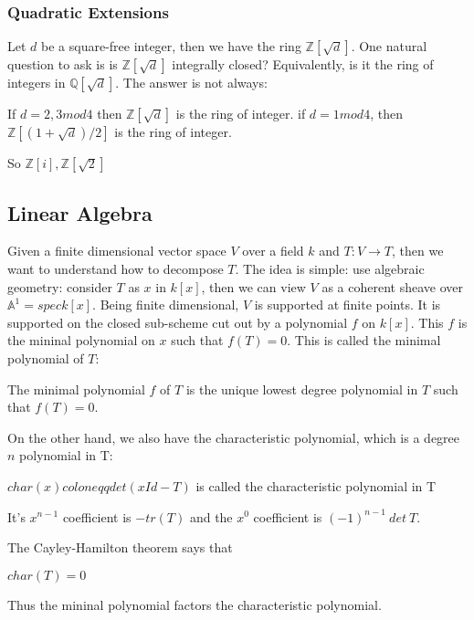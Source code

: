 \documentclass[main.tex]{subfiles}
\begin{document}
\subsubsection{Quadratic Extensions}
Let $d$ be a square-free integer, then we have the ring $\mathbb{Z}[\sqrt{d}]$. One natural question to ask is is $\mathbb{Z}[\sqrt{d}]$ integrally closed? Equivalently, is it the ring of integers in $\mathbb{Q}[\sqrt{d}]$. The answer is not always:

\begin{theorem}
If $d = 2,3 mod 4$ then $\mathbb{Z}[\sqrt{d}]$ is the ring of integer. if $d = 1 mod 4$, then $\mathbb{Z}[(1 + \sqrt{d})/2]$ is the ring of integer.
\end{theorem}

\begin{example}
So $\mathbb{Z}[i], \mathbb{Z}[\sqrt{2}]$
\end{example}


\subsection{Linear Algebra}


Given a finite dimensional vector space $V$ over a field $k$ and $T: V \rightarrow T$, then we want to understand how to decompose $T$. The idea is simple: use algebraic geometry: consider $T$ as $x$ in $k[x]$, then we can view $V$ as a coherent sheave over $\mathbb{A}^1 = spec k[x]$. Being finite dimensional, $V$ is supported at finite points. It is supported on the closed sub-scheme cut out by a polynomial $f$ on $k[x]$. This $f$ is the mininal polynomial on $x$ such that $f(T) = 0$. This is called the minimal polynomial of $T$: 

\begin{definition}
The minimal polynomial $f$ of $T$ is the unique lowest degree polynomial in $T$ such that $f(T) = 0$.
\end{definition}

On the other hand, we also have the characteristic polynomial, which is a degree $n$ polynomial in T:
\begin{definition}
$char(x) coloneqq det (xId - T)$ is called the characteristic polynomial in T
\end{definition}

It's $x^{n-1}$ coefficient is $-tr(T)$ and the $x^0$ coefficient is $(-1)^{n-1} \ det \ T$. 

The Cayley-Hamilton theorem says that 
\begin{theorem}
$char(T) = 0$
\end{theorem}
Thus the mininal polynomial factors the characteristic polynomial.
\end{document}
